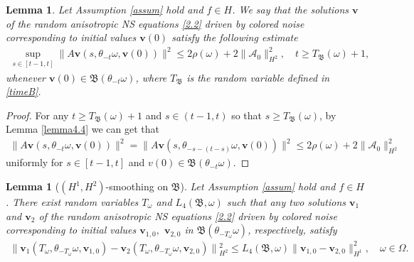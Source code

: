 \documentclass{elsarticle}
\newtheorem{lemma}[theorem]{Lemma}
\theoremstyle{definition}
\numberwithin{equation}{section}
\begin{document}
\begin{lemma}  Let Assumption \ref{assum} hold and $f\in H$. We say that
the solutions $\textbf{v}$ of the random anisotropic  NS equations \eqref{2.2} driven by colored noise corresponding to initial values  $\textbf{v}(0)$  satisfy the following estimate
\begin{align}
\sup_{s\in [t-1,t]}
 \|A\textbf{v}(s,\theta_{-t}\omega,  \textbf{v}(0)) \|^2
  \leq     2\rho(\omega) +2\|\mathcal A_0\|_{H^2}^2,
 \quad  t\geq T_{\mathfrak B} (\omega)+ 1,\label{mar9.4}
\end{align}
whenever  $\textbf{v}(0) \in\mathfrak B (\theta_{-t} \omega)$, where  $T_{\mathfrak B} $ is the random variable defined in   \eqref{timeB}.
\end{lemma}
\begin{proof}
For any $ t\geq T_{\mathfrak B} (\omega)+1$ and $s\in (t-1,t)$ so that $s\geq T_{\mathfrak B} (\omega)$, by
 Lemma \ref{lemma4.4} we can get that
\begin{align*}
 \|A\textbf{v}(s,\theta_{-t}\omega,  \textbf{v}(0)) \|^2    =
 \|A\textbf{v}(s,\theta_{-s-(t-s)}\omega,  \textbf{v}(0)) \|^2
 \leq     2\rho(\omega) +2\|\mathcal A_0\|_{H^2}^2
\end{align*}
uniformly for $s\in [t-1,t]$ and $v(0) \in\mathfrak B (\theta_{-t} \omega)$.
\end{proof}




\begin{lemma}[$(H^1, H^2)$-smoothing on $\mathfrak B$]\label{lemma5.1}  Let Assumption \ref{assum} hold and $f\in H$. There  exist  random variables $T_\omega$ and $ L_4(\mathfrak B, \omega )$ such that   any two solutions $\textbf{v}_1$ and $\textbf{v}_2$ of the random anisotropic  NS equations \eqref{2.2} driven by colored noise corresponding to initial values  $\textbf{v}_{1,0},$ $\textbf{v}_{2,0}$ in $\mathfrak{B}(\theta_{-T_\omega}\omega)$, respectively,   satisfy
\begin{align*}
 \big \|\textbf{v}_1(T_\omega,\theta_{-T_\omega}\omega,\textbf{v}_{1,0})-\textbf{v}_2(T_\omega,\theta_{-T_\omega}\omega,\textbf{v}_{2,0}) \big \|{^2_{H^2}}\leq  L_4(\mathfrak B, \omega)\|\textbf{v}_{1,0}-\textbf{v}_{2,0}\|^2_{H^1}, \quad \omega\in \Omega.
\end{align*}
\end{lemma}
\end{document}
